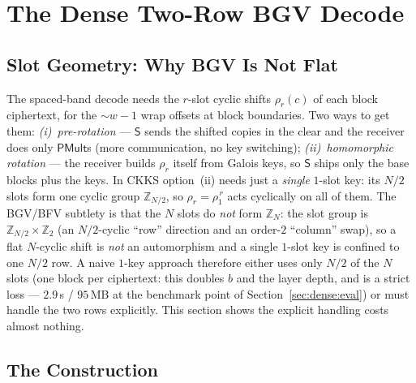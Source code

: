 \documentclass[runningheads]{llncs}
\newcommand{\Z}{\mathbb{Z}}
\newcommand{\PMult}{\mathsf{PMult}}          %
\newcommand{\rr}{\rho}                       %
\newcommand{\Snd}{\mathsf{S}}                %
\newcommand{\band}{w}                        %
\begin{document}
\section{The Dense Two-Row BGV Decode}
\label{sec:dense}

\subsection{Slot Geometry: Why BGV Is Not Flat}
\label{sec:dense:geometry}

The spaced-band decode needs the $r$-slot cyclic shifts $\rr_r(c)$ of each block
ciphertext, for the $\sim\band{-}1$ wrap offsets at block boundaries. Two ways to get
them: \emph{(i)~pre-rotation} --- $\Snd$ sends the shifted copies in the clear and the
receiver does only $\PMult$s (more communication, no key switching); \emph{(ii)~homomorphic
rotation} --- the receiver builds $\rr_r$ itself from Galois keys, so $\Snd$ ships only
the base blocks plus the keys. In CKKS option~(ii) needs just a \emph{single} $1$-slot
key: its $N/2$ slots form one cyclic group $\Z_{N/2}$, so $\rr_r=\rr_1^{\,r}$ acts
cyclically on all of them. The BGV/BFV subtlety is that the $N$ slots do \emph{not}
form $\Z_N$: the slot group is $\Z_{N/2}\times\Z_2$ (an $N/2$-cyclic ``row'' direction
and an order-$2$ ``column'' swap), so a flat $N$-cyclic shift is \emph{not} an
automorphism and a single $1$-slot key is confined to one $N/2$ row. A naive $1$-key
approach therefore either uses only $N/2$ of the $N$ slots (one block per ciphertext:
this doubles $b$ and the layer depth, and is a strict loss --- $2.9$\,s / $95$\,MB at
the benchmark point of Section~\ref{sec:dense:eval}) or must handle the two rows
explicitly. This section shows the explicit handling costs almost nothing.

\subsection{The Construction}
\label{sec:dense:construction}
\end{document}
